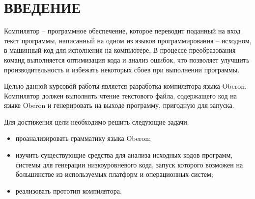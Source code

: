 \section*{ВВЕДЕНИЕ}

Компилятор -- программное обеспечение, которое переводит поданный на вход текст программы, написанный на одном из языков программирования -- исходном, в машинный код для исполнения на компьютере. В процессе преобразования команд выполняется оптимизация кода и анализ ошибок, что позволяет улучшить производительность и избежать некоторых сбоев при выполнении программы. \cite{bib:compilerIS}

Целью данной курсовой работы является разработка компилятора языка Oberon. Компилятор должен выполнять чтение текстового файла, содержащего код на языке Oberon и генерировать на выходе программу, пригодную для запуска.

Для достижения цели необходимо решить следующие задачи:
\begin{itemize}	
	\item проанализировать грамматику языка Oberon;
	
	\item изучить существующие средства для анализа исходных кодов программ, системы для генерации низкоуровневого кода, запуск которого возможен на большинстве из используемых платформ и операционных систем;
	
	\item реализовать прототип компилятора.
\end{itemize}


\pagebreak




















